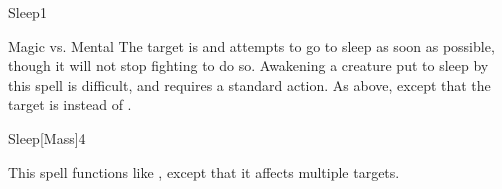 \begin{spellsection}{Sleep}{1}
    \begin{spellheader}
    \end{spellheader}
    \begin{spellcontent}
        \begin{spelltargetinginfo}
        \end{spelltargetinginfo}
        \begin{spelleffects}
            \begin{spellattack}{Magic vs. Mental}
                \spellsuccess The target is \fatigued and attempts to go to sleep as soon as possible, though it will not stop fighting to do so. Awakening a creature put to sleep by this spell is difficult, and requires a standard action.
                \spellcritical As above, except that the target is \exhausted instead of \fatigued.
            \end{spellattack}
            \spelldur \durshort
        \end{spelleffects}
    \end{spellcontent}
    \begin{spellfooter}
        \miscastrandom
    \end{spellfooter}
\end{spellsection}

\begin{spellsection}{Sleep}[Mass]{4}
    \begin{spellheader}
    \end{spellheader}
    \begin{spellcontent}
        \begin{spelltargetinginfo}
        \end{spelltargetinginfo}
        \begin{spelleffects}
            \spellspecial This spell functions like , except that it affects multiple targets.
        \end{spelleffects}
    \end{spellcontent}
    \begin{spellfooter}
        \miscastexplode
    \end{spellfooter}
\end{spellsection}


